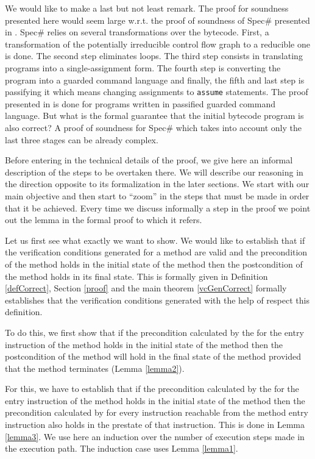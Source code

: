 We would like to make a last but not least remark. The proof for soundness presented here would seem large w.r.t. 
the proof of soundness of Spec\# presented in  \cite{leinoWPUP}. Spec\# relies on several transformations over the 
bytecode. First, a transformation of the potentially irreducible control flow graph to a reducible one is done.
The second step  eliminates loops. The third step consists in translating programs into a single-assignment form.
The fourth step is converting the program into a  guarded command language and finally, the fifth and last 
step is passifying it which means changing assignments
to \texttt{assume} statements. The proof presented in  
\cite{leinoWPUP} is done for  programs written in passified guarded command language.
But what is the formal guarantee that the initial  bytecode program is also correct? 
A proof of soundness for Spec\# which takes into account only the last three stages can be 
already complex. 


Before entering in the technical details of the proof, we 
give here an informal description of the steps to be overtaken there.
We will describe our reasoning in the direction opposite to its formalization in the later sections.
 We start with our main objective and then start to ``zoom'' in the steps that must be made in order that it be achieved. 
Every time we discuss informally a step in the proof we point out the lemma in the formal proof to which it refers.

Let us first see what exactly we want to show. 
We would like to establish that if the verification conditions
generated for a method 
are valid and the precondition of the method holds in the initial state of the method 
then the postcondition of  the method holds in its final state. This is formally given in Definition \ref{defCorrect}, Section \ref{proof}
and the main theorem \ref{vcGenCorrect} formally establishes that the verification conditions generated with the help of \fwpi{} respect this definition. 

To do this, we first show that if the precondition calculated by the \fwpi{} for the entry instruction of the method
holds in the initial state of the method
then the postcondition of the method will hold in the final state of the method provided that the method terminates
(Lemma \ref{lemma2}). 

 For this, we have to establish that if the precondition calculated by
the \fwpi{} for the entry instruction of the method holds in the initial state of the method then the precondition calculated by \fwpi{}
for every instruction reachable from the method entry instruction also holds in the prestate of that instruction. This is done in Lemma \ref{lemma3}. 
We use here an induction over the number of execution steps made in the execution path.
The induction case uses Lemma \ref{lemma1}.

